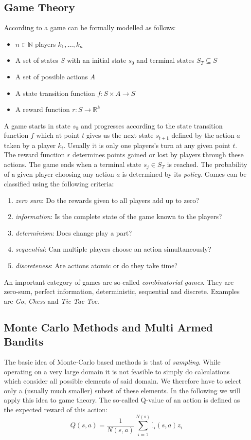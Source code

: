 \subsection{Game Theory}
\label{ss:game_theory}
According to \cite{browne2012survey} a game can be formally modelled as follows:
\begin{itemize}[noitemsep]
    \item $n \in \mathbb{N}$ players $k_1, \ldots, k_n$
    \item A set of states $S$ with an initial state $s_0$ and terminal states $S_T \subseteq S$
    \item A set of possible actions $A$
    \item A state transition function $f: S \times A \to S$
    \item A reward function $r: S \to \mathbb{R}^k$
\end{itemize}
A game starts in state $s_0$ and progresses according to the state transition function $f$ which at point $t$ gives us the next state $s_{t+1}$ defined by the action $a$ taken by a player $k_i$. Usually it is only one players's turn at any given point $t$. The reward function $r$ determines points gained or lost by players through these actions. The game ends when a terminal state $s_j \in S_T$ is reached. The probability of a given player choosing any action $a$ is determined by its \textit{policy}. Games can be classified using the following criteria:
\begin{enumerate}[label=\alph*)]
    \item \textit{zero sum}: Do the rewards given to all players add up to zero?
    \item \textit{information}: Is the complete state of the game known to the players?
    \item \textit{determinism}: Does change play a part?
    \item \textit{sequential}: Can multiple players choose an action simultaneously?
    \item \textit{discreteness}: Are actions atomic or do they take time? 
\end{enumerate}
An important category of games are so-called \textit{combinatorial games}. They are zero-sum, perfect information, deterministic, sequential and discrete. Examples are \textit{Go}, \textit{Chess} and \textit{Tic-Tac-Toe}.

\subsection{Monte Carlo Methods and Multi Armed Bandits}
The basic idea of Monte-Carlo based methods is that of \textit{sampling}. While operating on a very large domain it is not feasible to simply do calculations which consider all possible elements of said domain. We therefore have to select only a (usually much smaller) subset of these elements. In the following we will apply this idea to game theory. 
The so-called Q-value of an action is defined as the expected reward of this action:
\begin{equation}
    Q(s,a)= \frac{1}{N(s,a)} \sum_{i=1}^{N(s)} \mathbb{I}_i(s,a)z_i
\end{equation}

